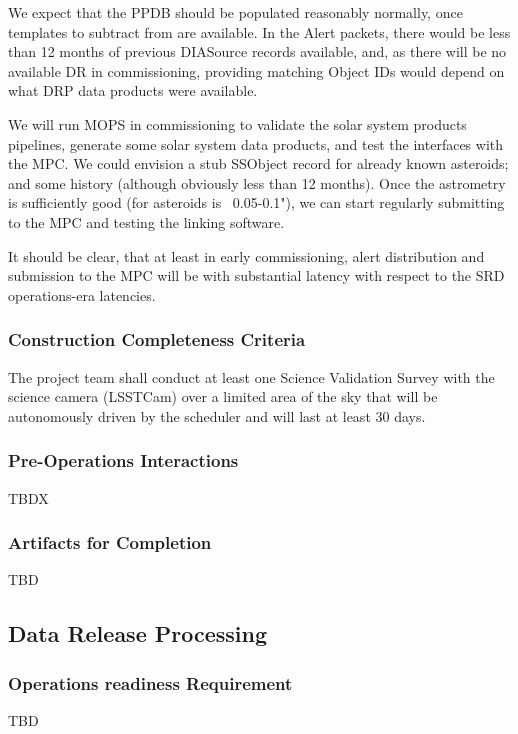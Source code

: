 We expect that the PPDB should be populated reasonably normally, once templates to subtract from are available.  In the Alert packets, there would be less than 12 months of previous DIASource records available, and, as there will be no available DR in commissioning, providing matching Object IDs would depend on what DRP data products were available. 

We will run MOPS in commissioning to validate the solar system products pipelines, generate some solar system data products, and test the interfaces with the MPC. We could envision a stub SSObject record for already known asteroids; and some history (although obviously less than 12 months). Once the astrometry is sufficiently good (for asteroids is ~0.05-0.1"),  we can start regularly submitting to the MPC and testing the linking software. 

It should be clear, that at least in early commissioning, alert distribution and submission to the MPC  will be with substantial latency with respect to the SRD operations-era latencies.  

\subsubsection{Construction Completeness Criteria}
The project team shall conduct at least one Science Validation Survey with the science camera (LSSTCam) over a limited area of the sky that will be autonomously driven by the scheduler and will last at least 30 days.

\subsubsection{Pre-Operations Interactions}
TBDX

\subsubsection{Artifacts for Completion}
TBD


\subsection{Data Release Processing}

\subsubsection{Operations readiness Requirement}
TBD

